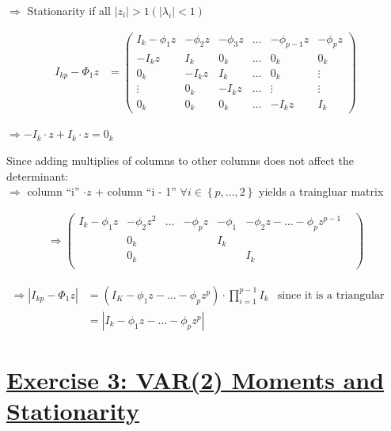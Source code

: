 \documentclass[12pt,a4paper]{article}
\newcommand{\tmpsection}[1]{}
\let\tmpsection=\section
\renewcommand{\section}[1]{\tmpsection{\underline{#1}} }
\begin{document}
\(\Rightarrow\) Stationarity if all \(|z_i| > 1 (|\lambda_i| < 1)\)

\begin{align*}
  I_{kp} - \Phi_1 z & = 
  \begin{pmatrix}
    I_k - \phi_1 z & - \phi_2 z & - \phi_3 z & \ldots & - \phi_{p - 1} z & - \phi_{p} z \\
    - I_k z        & I_k        &  0_k       & \ldots & 0_k & 0_k \\
    0_k   & - I_k z        & I_k & \ldots & 0_k & \vdots\\
    \vdots & 0_k   & - I_k z        & \ldots & \vdots & \vdots \\
    0_k & 0_k & 0_k & \ldots &  - I_k z        & I_k
  \end{pmatrix}
\end{align*}

\(\Rightarrow -I_k \cdot z + I_k \cdot z = 0_k\)

Since adding multiplies of columns to other columns does not affect the
determinant:\\

\(\Rightarrow\) column \enquote{i} \(\cdot z\) + column \enquote{i - 1}
\(\forall i \in \left\{ p, \ldots, 2\right\}\) yields a traingluar
matrix

\begin{align*}
  \Rightarrow
  \begin{pmatrix}
    I_k - \phi_1 z & - \phi_2 z^2 & \ldots & - \phi_{p} z & -\phi_1 & -\phi_2 z - \ldots -\phi_p z^{p-1}  \\
    & 0_k & & & I_k & &\\
    & 0_k & & & & I_k &\\
  \end{pmatrix}
\end{align*}

\begin{align*}
  \Rightarrow \left| I_{kp} - \Phi_1 z \right| & = \left( I_K - \phi_1 z - \ldots - \phi_p z^p \right) \cdot \prod_{i = 1}^{p-1} I_k & \text{since it is a triangular matrix}\\
  & = \left| I_k - \phi_1 z - \ldots - \phi_p z^p \right| 
\end{align*}

\hypertarget{exercise-3-var2-moments-and-stationarity}{%
\section{Exercise 3: VAR(2) Moments and
Stationarity}\label{exercise-3-var2-moments-and-stationarity}}
\end{document}
